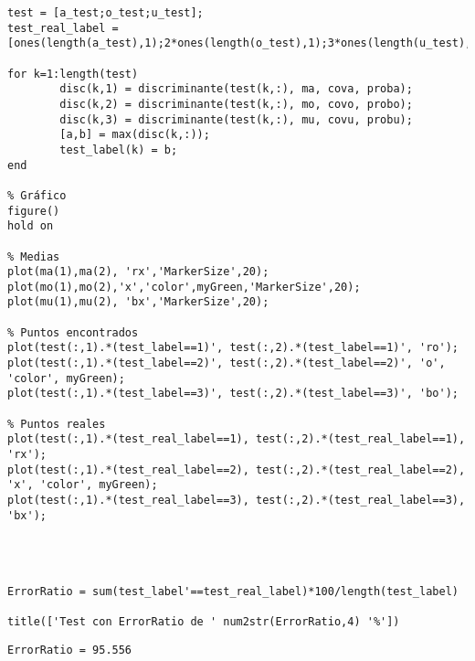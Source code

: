 \begin{lstlisting}
test = [a_test;o_test;u_test];
test_real_label = [ones(length(a_test),1);2*ones(length(o_test),1);3*ones(length(u_test),1)];

for k=1:length(test)
		disc(k,1) = discriminante(test(k,:), ma, cova, proba);
		disc(k,2) = discriminante(test(k,:), mo, covo, probo);
		disc(k,3) = discriminante(test(k,:), mu, covu, probu);
		[a,b] = max(disc(k,:));
		test_label(k) = b;
end

% Gráfico
figure()
hold on

% Medias
plot(ma(1),ma(2), 'rx','MarkerSize',20);
plot(mo(1),mo(2),'x','color',myGreen,'MarkerSize',20);
plot(mu(1),mu(2), 'bx','MarkerSize',20);

% Puntos encontrados
plot(test(:,1).*(test_label==1)', test(:,2).*(test_label==1)', 'ro');
plot(test(:,1).*(test_label==2)', test(:,2).*(test_label==2)', 'o', 'color', myGreen);
plot(test(:,1).*(test_label==3)', test(:,2).*(test_label==3)', 'bo');

% Puntos reales
plot(test(:,1).*(test_real_label==1), test(:,2).*(test_real_label==1), 'rx');
plot(test(:,1).*(test_real_label==2), test(:,2).*(test_real_label==2), 'x', 'color', myGreen);
plot(test(:,1).*(test_real_label==3), test(:,2).*(test_real_label==3), 'bx');




ErrorRatio = sum(test_label'==test_real_label)*100/length(test_label)

title(['Test con ErrorRatio de ' num2str(ErrorRatio,4) '%'])
\end{lstlisting}
\begin{lstlisting}[language={},xleftmargin=5pt,frame=none]
ErrorRatio = 95.556 

\end{lstlisting}


